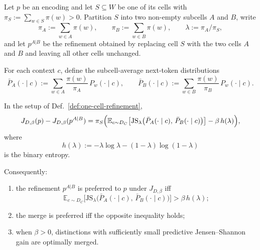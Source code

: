 \documentclass[twoside,11pt]{article}
\newcommand{\E}{\mathbb{E}}
\newcommand{\JS}{\mathrm{JS}}
\newcommand{\defref}[1]{Def.~\ref{#1}}
\begin{document}
\begin{definition}\label{def:one-cell-refinement}
Let $p$ be an encoding and let $S \subseteq W$ be one of its cells with $\pi_S := \sum_{w \in S}\pi(w) > 0$. Partition $S$ into two non-empty subcells $A$ and $B$, write
\[
\pi_A := \sum_{w \in A}\pi(w),
\qquad
\pi_B := \sum_{w \in B}\pi(w),
\qquad
\lambda := \pi_A/\pi_S,
\]
and let $p^{A|B}$ be the refinement obtained by replacing cell $S$ with the two cells $A$ and $B$ and leaving all other cells unchanged.

For each context $c$, define the subcell-average next-token distributions
\[
\bar P_A(\cdot \mid c)
:= \sum_{w \in A} \frac{\pi(w)}{\pi_A}\, P_w(\cdot \mid c),
\qquad
\bar P_B(\cdot \mid c)
:= \sum_{w \in B} \frac{\pi(w)}{\pi_B}\, P_w(\cdot \mid c).
\]
\end{definition}

\begin{theorem}\label{thm:split-threshold}
In the setup of \defref{def:one-cell-refinement},
\[
J_{D,\beta}(p) - J_{D,\beta}(p^{A|B})
= \pi_S \Bigl(
    \E_{c \sim D_C}\bigl[
      \JS_{\lambda}\bigl(\bar P_A(\cdot \mid c),\, \bar P_B(\cdot \mid c)\bigr)
    \bigr]
    - \beta\, h(\lambda)
  \Bigr),
\]
where
\[
h(\lambda) := -\lambda \log \lambda - (1-\lambda)\log(1-\lambda)
\]
is the binary entropy.

Consequently:
\begin{enumerate}[label=(\alph*)]
\item the refinement $p^{A|B}$ is preferred to $p$ under $J_{D,\beta}$ iff
\[
\E_{c \sim D_C}\bigl[
  \JS_{\lambda}\bigl(\bar P_A(\cdot \mid c),\, \bar P_B(\cdot \mid c)\bigr)
\bigr]
> \beta\, h(\lambda);
\]

\item the merge is preferred iff the opposite inequality holds;

\item when $\beta > 0$, distinctions with sufficiently small predictive Jensen--Shannon gain are optimally merged.
\end{enumerate}
\end{theorem}
\end{document}
